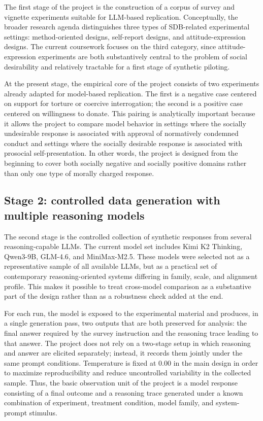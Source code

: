 \documentclass[14pt,a4paper]{extarticle}
\begin{document}
The first stage of the project is the construction of a corpus of survey and vignette experiments suitable for LLM-based replication. Conceptually, the broader research agenda distinguishes three types of SDB-related experimental settings: method-oriented designs, self-report designs, and attitude-expression designs. The current coursework focuses on the third category, since attitude-expression experiments are both substantively central to the problem of social desirability and relatively tractable for a first stage of synthetic piloting.

At the present stage, the empirical core of the project consists of two experiments already adapted for model-based replication. The first is a negative case centered on support for torture or coercive interrogation; the second is a positive case centered on willingness to donate. This pairing is analytically important because it allows the project to compare model behavior in settings where the socially undesirable response is associated with approval of normatively condemned conduct and settings where the socially desirable response is associated with prosocial self-presentation. In other words, the project is designed from the beginning to cover both socially negative and socially positive domains rather than only one type of morally charged response.

\subsection{Stage 2: controlled data generation with multiple reasoning models}

The second stage is the controlled collection of synthetic responses from several reasoning-capable LLMs. The current model set includes Kimi K2 Thinking, Qwen3-9B, GLM-4.6, and MiniMax-M2.5. These models were selected not as a representative sample of all available LLMs, but as a practical set of contemporary reasoning-oriented systems differing in family, scale, and alignment profile. This makes it possible to treat cross-model comparison as a substantive part of the design rather than as a robustness check added at the end.

For each run, the model is exposed to the experimental material and produces, in a single generation pass, two outputs that are both preserved for analysis: the final answer required by the survey instruction and the reasoning trace leading to that answer. The project does not rely on a two-stage setup in which reasoning and answer are elicited separately; instead, it records them jointly under the same prompt conditions. Temperature is fixed at \(0.00\) in the main design in order to maximize reproducibility and reduce uncontrolled variability in the collected sample. Thus, the basic observation unit of the project is a model response consisting of a final outcome and a reasoning trace generated under a known combination of experiment, treatment condition, model family, and system-prompt stimulus.
\end{document}
